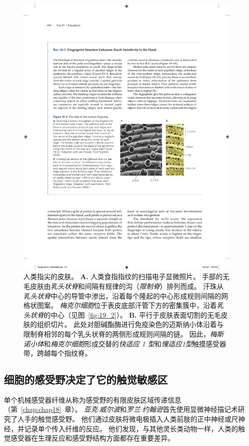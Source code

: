 \begin{figure}[htbp]
	\centering
	\includegraphics[width=0.7\linewidth]{chap19/fig_19_3}
	\caption{人类指尖的皮肤。
		\textbf{A.} 人类食指指纹的扫描电子显微照片。
		手部的无毛皮肤由\textit{乳头状脊}和间隔有规律的沟（\textit{限制脊}）排列而成。
		汗珠从\textit{乳头状脊}中心的导管中渗出，沿着每个隆起的中心形成规则间隔的网格状图案。
		\textit{梅克尔细胞}位于表皮底部汗管下方的密集簇中，沿着\textit{乳头状脊}的中心（见图~\ref{fig:19_2}）。
		 \textbf{B.} 平行于皮肤表面切割的无毛皮肤的组织切片。
		 此处对胆碱酯酶进行免疫染色的迈斯纳小体沿着与限制脊相邻的每个乳头状脊的两侧形成规则间隔的链。
		 因此，\textit{梅斯诺小体}和\textit{梅克尔细胞}形成交替的\textit{快适应 1 型}和\textit{慢适应1型}触摸感受器带，跨越每个指纹脊\cite{bolanowski2003organization}。}
	\label{fig:19_3}
\end{figure}



\subsection{细胞的感受野决定了它的触觉敏感区}

单个机械感受器纤维从称为感受野的有限皮肤区域传递信息（第~\ref{chap:chap18}~章）。
\textit{亚克$\cdot$威尔波}和\textit{罗兰$\cdot$约翰逊}首先使用显微神经描记术研究了人手的触觉感受野。
他们通过皮肤将微电极插入人类前肢的正中神经或尺神经，并记录单个传入纤维的反应。
他们发现，与其他灵长类动物一样，人类的触觉感受器在生理反应和感受野结构方面都存在重要差异。


